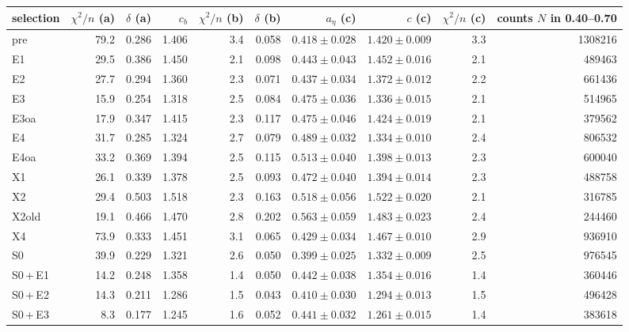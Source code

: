 \begin{tabular}{@{}l r r r r r r r r r@{}}
\toprule
selection & $\chi^2/n$ (a) & $\delta$ (a) & $c_b$ & $\chi^2/n$ (b) & $\delta$ (b) & $a_\eta$ (c) & $c$ (c) & $\chi^2/n$ (c) & counts $N$ in 0.40--0.70 \\
\midrule
pre & 79.2 & 0.286 & 1.406 & 3.4 & 0.058 & $0.418\pm0.028$ & $1.420\pm0.009$ & 3.3 & 1308216 \\
E1 & 29.5 & 0.386 & 1.450 & 2.1 & 0.098 & $0.443\pm0.043$ & $1.452\pm0.016$ & 2.1 & 489463 \\
E2 & 27.7 & 0.294 & 1.360 & 2.3 & 0.071 & $0.437\pm0.034$ & $1.372\pm0.012$ & 2.2 & 661436 \\
E3 & 15.9 & 0.254 & 1.318 & 2.5 & 0.084 & $0.475\pm0.036$ & $1.336\pm0.015$ & 2.1 & 514965 \\
E3oa & 17.9 & 0.347 & 1.415 & 2.3 & 0.117 & $0.475\pm0.046$ & $1.424\pm0.019$ & 2.1 & 379562 \\
E4 & 31.7 & 0.285 & 1.324 & 2.7 & 0.079 & $0.489\pm0.032$ & $1.334\pm0.010$ & 2.4 & 806532 \\
E4oa & 33.2 & 0.369 & 1.394 & 2.5 & 0.115 & $0.513\pm0.040$ & $1.398\pm0.013$ & 2.3 & 600040 \\
X1 & 26.1 & 0.339 & 1.378 & 2.5 & 0.093 & $0.472\pm0.040$ & $1.394\pm0.014$ & 2.3 & 488758 \\
X2 & 29.4 & 0.503 & 1.518 & 2.3 & 0.163 & $0.518\pm0.056$ & $1.522\pm0.020$ & 2.1 & 316785 \\
X2old & 19.1 & 0.466 & 1.470 & 2.8 & 0.202 & $0.563\pm0.059$ & $1.483\pm0.023$ & 2.4 & 244460 \\
X4 & 73.9 & 0.333 & 1.451 & 3.1 & 0.065 & $0.429\pm0.034$ & $1.467\pm0.010$ & 2.9 & 936910 \\
\midrule
S0 & 39.9 & 0.229 & 1.321 & 2.6 & 0.050 & $0.399\pm0.025$ & $1.332\pm0.009$ & 2.5 & 976545 \\
S0\,+\,E1 & 14.2 & 0.248 & 1.358 & 1.4 & 0.050 & $0.442\pm0.038$ & $1.354\pm0.016$ & 1.4 & 360446 \\
S0\,+\,E2 & 14.3 & 0.211 & 1.286 & 1.5 & 0.043 & $0.410\pm0.030$ & $1.294\pm0.013$ & 1.5 & 496428 \\
S0\,+\,E3 & 8.3 & 0.177 & 1.245 & 1.6 & 0.052 & $0.441\pm0.032$ & $1.261\pm0.015$ & 1.4 & 383618 \\

\end{tabular}
